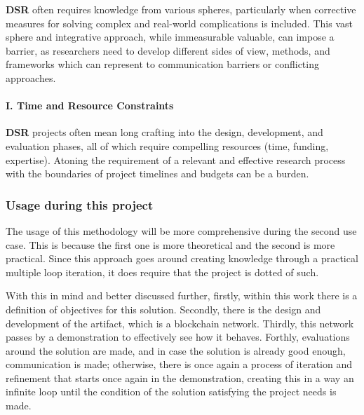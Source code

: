 \textbf{DSR} often requires knowledge from various spheres, particularly when corrective measures for solving complex and real-world complications is included. This vast sphere and integrative approach, while immeasurable valuable, can impose a barrier, as researchers need to develop different sides of view, methods, and frameworks which can represent to communication barriers or conflicting approaches.

\paragraph{I. Time and Resource Constraints}\mbox{}

\textbf{DSR} projects often mean long crafting into the design, development, and evaluation phases, all of which require compelling resources (time, funding, expertise). Atoning the requirement of a relevant and effective research process with the boundaries of project timelines and budgets can be a burden.

\subsubsection{Usage during this project}

The usage of this methodology will be more comprehensive during the second use case. This is because the first one is more theoretical and the second is more practical. Since this approach goes around creating knowledge through a practical multiple loop iteration, it does require that the project is dotted of such.

With this in mind and better discussed further, firstly, within this work there is a definition of objectives for this solution. Secondly, there is the design and development of the artifact, which is a blockchain network. Thirdly, this network passes by a demonstration to effectively see how it behaves. Forthly, evaluations around the solution are made, and in case the solution is already good enough, communication is made; otherwise, there is once again a process of iteration and refinement that starts once again in the demonstration, creating this in a way an infinite loop until the condition of the solution satisfying the project needs is made.

%
%
%
%
